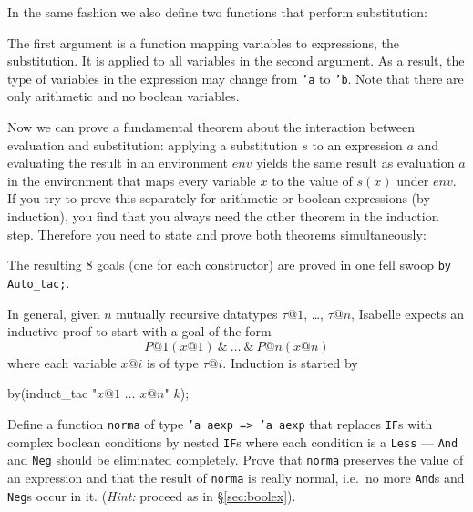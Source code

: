 
In the same fashion we also define two functions that perform substitution:
\begin{ttbox}
\end{ttbox}
The first argument is a function mapping variables to expressions, the
substitution. It is applied to all variables in the second argument. As a
result, the type of variables in the expression may change from \texttt{'a}
to \texttt{'b}. Note that there are only arithmetic and no boolean variables.
\begin{ttbox}

\end{ttbox}

Now we can prove a fundamental theorem about the interaction between
evaluation and substitution: applying a substitution $s$ to an expression $a$
and evaluating the result in an environment $env$ yields the same result as
evaluation $a$ in the environment that maps every variable $x$ to the value
of $s(x)$ under $env$. If you try to prove this separately for arithmetic or
boolean expressions (by induction), you find that you always need the other
theorem in the induction step. Therefore you need to state and prove both
theorems simultaneously:
\begin{quote}\small

\end{quote}
The resulting 8 goals (one for each constructor) are proved in one fell swoop
\texttt{by Auto_tac;}.

In general, given $n$ mutually recursive datatypes $\tau@1$, \dots, $\tau@n$,
Isabelle expects an inductive proof to start with a goal of the form
\[ P@1(x@1)\ \texttt{\&}\ \dots\ \texttt{\&}\ P@n(x@n) \]
where each variable $x@i$ is of type $\tau@i$. Induction is started by
\begin{ttbox}
by(induct_tac "\(x@1\) \(\dots\) \(x@n\)" \(k\));
\end{ttbox}

\begin{exercise}
  Define a function \texttt{norma} of type \texttt{'a aexp => 'a aexp} that
  replaces \texttt{IF}s with complex boolean conditions by nested
  \texttt{IF}s where each condition is a \texttt{Less} --- \texttt{And} and
  \texttt{Neg} should be eliminated completely. Prove that \texttt{norma}
  preserves the value of an expression and that the result of \texttt{norma}
  is really normal, i.e.\ no more \texttt{And}s and \texttt{Neg}s occur in
  it.  ({\em Hint:} proceed as in \S\ref{sec:boolex}).
\end{exercise}


